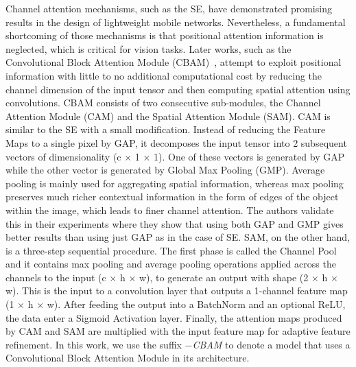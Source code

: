 \documentclass[journal]{IEEEtran}
\begin{document}
Channel attention mechanisms, such as the SE, have demonstrated promising results in the design of lightweight mobile networks. Nevertheless, a fundamental shortcoming of those mechanisms is that positional attention information is neglected, which is critical for vision tasks. Later works, such as the Convolutional Block Attention Module (CBAM)~\cite{Woo_2018_ECCV}, attempt to exploit positional information with little to no additional computational cost by reducing the channel dimension of the input tensor and then computing spatial attention using convolutions. CBAM consists of two consecutive sub-modules, the Channel Attention Module (CAM) and the Spatial Attention Module (SAM). CAM is similar to the SE with a small modification. Instead of reducing the Feature Maps to a single pixel by GAP, it decomposes the input tensor into 2 subsequent vectors of dimensionality (c $\times$ 1 $\times$ 1). One of these vectors is generated by GAP while the other vector is generated by Global Max Pooling (GMP). Average pooling is mainly used for aggregating spatial information, whereas max pooling preserves much richer contextual information in the form of edges of the object within the image, which leads to finer channel attention. The authors validate this in their experiments where they show that using both GAP and GMP gives better results than using just GAP as in the case of SE. SAM, on the other hand, is a three-step sequential procedure. The first phase is called the Channel Pool and it contains max pooling and average pooling operations applied across the channels to the input (c $\times$ h $\times$ w), to generate an output with shape (2 $\times$ h $\times$ w). This is the input to a convolution layer that outputs a 1-channel feature map (1 $\times$ h $\times$ w). After feeding the output into a BatchNorm and an optional ReLU, the data enter a Sigmoid Activation layer. Finally, the attention maps produced by CAM and SAM are multiplied with the input feature map for adaptive feature refinement. In this work, we use the suffix \textit{$-$CBAM} to denote a model that uses a Convolutional Block Attention Module in its architecture.
\end{document}
